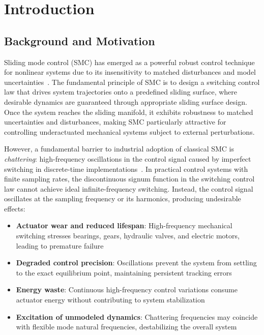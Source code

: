 \documentclass[12pt,a4paper,oneside]{report}
\begin{document}
\chapter{Introduction}
\label{ch:introduction}

\section{Background and Motivation}

Sliding mode control (SMC) has emerged as a powerful robust control technique for nonlinear systems due to its insensitivity to matched disturbances and model uncertainties~\cite{utkin1977variable, slotine1991applied}. The fundamental principle of SMC is to design a switching control law that drives system trajectories onto a predefined sliding surface, where desirable dynamics are guaranteed through appropriate sliding surface design. Once the system reaches the sliding manifold, it exhibits robustness to matched uncertainties and disturbances, making SMC particularly attractive for controlling underactuated mechanical systems subject to external perturbations.

However, a fundamental barrier to industrial adoption of classical SMC is \emph{chattering}: high-frequency oscillations in the control signal caused by imperfect switching in discrete-time implementations~\cite{bartolini1998chattering}. In practical control systems with finite sampling rates, the discontinuous signum function in the switching control law cannot achieve ideal infinite-frequency switching. Instead, the control signal oscillates at the sampling frequency or its harmonics, producing undesirable effects:

\begin{itemize}
\item \textbf{Actuator wear and reduced lifespan}: High-frequency mechanical switching stresses bearings, gears, hydraulic valves, and electric motors, leading to premature failure
\item \textbf{Degraded control precision}: Oscillations prevent the system from settling to the exact equilibrium point, maintaining persistent tracking errors
\item \textbf{Energy waste}: Continuous high-frequency control variations consume actuator energy without contributing to system stabilization
\item \textbf{Excitation of unmodeled dynamics}: Chattering frequencies may coincide with flexible mode natural frequencies, destabilizing the overall system
\end{itemize}
\end{document}
